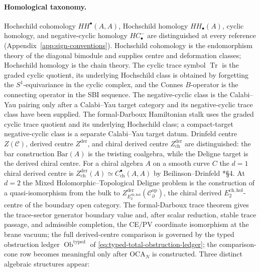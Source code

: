 \documentclass[11pt]{memoir}
\begin{document}
\paragraph{Homological taxonomy.}
Hochschild cohomology \(HH^\bullet(A,A)\), Hochschild homology
\(HH_\bullet(A)\), cyclic homology, and negative-cyclic homology
\(HC^-_\bullet\) are distinguished at every reference
(Appendix~\ref{app:sign-conventions}).  Hochschild cohomology is the
endomorphism theory of the diagonal bimodule and supplies centre and
deformation classes; Hochschild homology is the chain theory.  The
cyclic trace symbol \(\operatorname{Tr}\) is the graded cyclic quotient,
its underlying Hochschild class is obtained by forgetting the
\(S^1\)-equivariance in the cyclic complex, and the Connes \(B\)-operator
is the connecting operator in the SBI sequence.  The negative-cyclic
class is the Calabi--Yau pairing only after a Calabi--Yau target category
and its negative-cyclic trace class have been supplied.  The
formal-Darboux Hamiltonian stalk uses the graded cyclic trace quotient
and its underlying Hochschild class; a compact-target negative-cyclic
class is a separate Calabi--Yau target datum.  Drinfeld centre \(Z(\mathcal C)\), derived centre
\(Z^{\mathrm{der}}\), and chiral derived centre
\(Z^{\mathrm{der}}_{\mathrm{ch}}\) are distinguished: the bar
construction \(\mathrm{Bar}(A)\) is the twisting coalgebra, while the
Deligne target is the derived chiral centre.  For a chiral algebra $A$ on a
smooth curve $C$ the $d=1$ chiral derived centre is
$Z^{\mathrm{der}}_{\mathrm{ch}}(A)\simeq C^\bullet_{\mathrm{ch}}(A,A)$
by Beilinson--Drinfeld \cite{beilinson-drinfeld-chiral}*{\S 4}.
At \(d=2\) the Mixed Holomorphic--Topological Deligne problem is the
construction of a quasi-isomorphism from the bulk to
\(Z^{\mathrm{der}}_{E_2^{\mathrm{ch,hol}}}
(\mathcal C^{\mathrm{op}}_\partial)\), the chiral derived
\(E_2^{\mathrm{ch,hol}}\)-centre of the boundary open category.  The
formal-Darboux trace theorem gives the trace-sector generator boundary value and, after
scalar reduction, stable trace passage, and admissible completion, the
CE/PV coordinate isomorphism at the brane vacuum; the full
derived-centre comparison is governed by the typed obstruction ledger
\(\operatorname{Ob}^{\mathrm{typed}}\) of
\eqref{eq:typed-total-obstruction-ledger}; the comparison-cone row
becomes meaningful only after \(\mathrm{OCA}_N\) is constructed.  Three distinct
algebraic structures appear:
\end{document}
